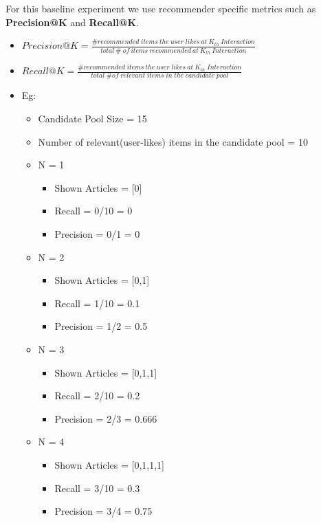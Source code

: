 \documentclass[a4paper,fontsize=8.0pt]{scrartcl}
\begin{document}
\begin{flushleft}
For this baseline experiment we use recommender specific metrics such as \textbf{Precision@K} and \textbf{Recall@K}.
\begin{itemize}
    \item $Precision@K = \frac{\# recommended \; items \: the \: user \; likes \: at \: K_{th} \: Interaction}{total \: \#  \: of \: items \:  recommended \: at \: K_{th} \: Interaction}$
    
    \item $Recall@K = \frac{\# recommended \; items \: the \: user \; likes \: at \: K_{th} \; Interaction}{total \; \# of \; relevant \; items \; in \; the \; candidate \; pool}$
    
    \item Eg:  \begin{itemize}
        \item Candidate Pool Size = 15
        \item Number of relevant(user-likes) items in the candidate pool = 10
        \item N = 1 \begin{itemize}
            \item Shown Articles = [0]
            \item Recall = 0/10 = 0
            \item Precision = 0/1 = 0
        \end{itemize}
        \item N = 2 \begin{itemize}
            \item Shown Articles = [0,1]
            \item Recall = 1/10 = 0.1
            \item Precision = 1/2 = 0.5
        \end{itemize}
        \item N = 3 \begin{itemize}
            \item Shown Articles = [0,1,1]
            \item Recall = 2/10 = 0.2
            \item Precision = 2/3 = 0.666
        \end{itemize}
        \item N = 4 \begin{itemize}
            \item Shown Articles = [0,1,1,1]
            \item Recall = 3/10 = 0.3
            \item Precision = 3/4 = 0.75
        \end{itemize}
    \end{itemize}
    
\end{itemize}
\end{flushleft}
\end{document}
